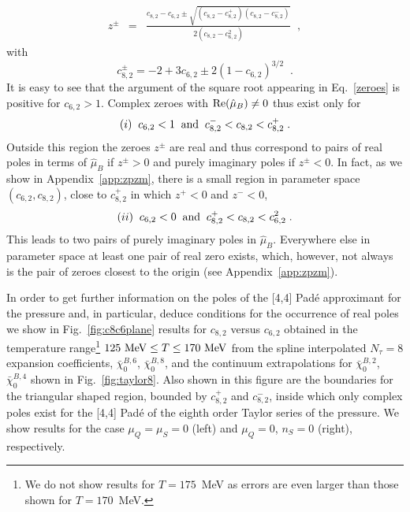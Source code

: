 \documentclass[pdflatex,prd,twocolumn,showpacs,superscriptaddress,nofootinbib]{revtex4-1}
\newcommand \hmu {\hat{\mu}}
\newcommand \cb {\bar{\chi}}
\newcommand{\muQ}{\mu_Q}
\begin{document}
\begin{eqnarray}
z^\pm &=&\frac{c_{8,2} - c_{6,2} \pm \sqrt{
(c_{8,2}-c_{8,2}^+) (c_{8,2}-c_{8,2}^-)}}{2 (c_{8,2} -c_{6,2}^2)} \;\; ,
\label{zeroes}
\end{eqnarray}
with
\begin{equation}
c_{8,2}^\pm = -2 + 3 c_{6,2} \pm 2(1-c_{6,2})^{3/2}
\;\; .
\label{c8pm}
\end{equation}
It is easy to see that the argument of the square root appearing in Eq.~\ref{zeroes} is positive for $c_{6,2}>1$. Complex zeroes with ${\rm Re}(\hmu_B)\ne 0$ thus exist only for
\begin{equation}
(i)\;\;	c_{6,2}<1 \;\; {\rm and}\;\;  c_{8,2}^{ -} < c_{8,2} < c_{8,2}^+ \;.
	\label{czeroes}
\end{equation}
Outside this region the zeroes $z^\pm$ are real and thus correspond to pairs of real poles in terms of $\hmu_B$ if $z^\pm>0$ and purely imaginary poles if $z^\pm<0$. In fact, as we show in Appendix~\ref{app:zpzm}, there is a  small region in parameter space
$(c_{6,2},c_{8,2})$, close to $c_{8,2}^+$ in which $z^+<0$
and $z^-<0$, 
\begin{equation}
(ii)\;\;    c_{6,2}<0\;\; {\rm and}\;\; 
    c_{8,2}^{+} < c_{8,2} < c_{6,2}^2
    \; .
\end{equation}
This leads to 
two pairs of purely imaginary poles in $\hmu_B$. Everywhere else in parameter space at least one pair of real zero exists, which, however, not always is the
pair of zeroes closest to the origin (see Appendix~\ref{app:zpzm}).
	
In order to get further information on the poles 
of the [4,4] Pad\'e approximant for the pressure
and, in particular, deduce conditions for the occurrence of real poles we show in Fig.~\ref{fig:c8c6plane} results for $c_{8,2}$ versus $c_{6,2}$ obtained in the 
temperature range\footnote{We do not show results for $T=175$~MeV as errors are even larger than those shown for $T=170$~MeV.} $125~{\rm MeV}\le T\le 170~{\rm MeV}$ from the spline interpolated $N_\tau=8$ expansion coefficients, $\cb_0^{B,6}$, $\cb_0^{B,8}$, and the continuum extrapolations for $\cb_0^{B,2}$, $\cb_0^{B,4}$ shown in Fig.~\ref{fig:taylor8}. Also shown in this figure are the boundaries for the triangular shaped region, bounded by $c_{8,2}^+$ and $c_{8,2}^-$,
inside which only complex poles exist for the [4,4] Pad\'e of the eighth order Taylor series of the pressure.
We show results for the case
$\mu_Q=\mu_S=0$ (left) and  $\muQ=0$, $n_S=0$  (right), respectively. 	
	
\end{document}
